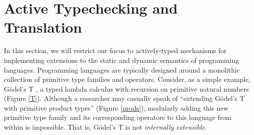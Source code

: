 


\section{Active Typechecking and Translation}\label{att}

In this section, we will restrict our focus to actively-typed mechanisms for implementing extensions to the static and dynamic semantics of programming languages. Programming languages are typically designed around a monolithic collection of primitive type families and operators. Consider, as a simple example, G\"odel's T \cite{pfpl}, a typed lambda calculus with recursion on primitive natural numbers (Figure \ref{T}). Although a researcher may casually speak of ``extending G\"odel's T with primitive product types'' (Figure \ref{prods}), modularly adding this new primitive type family and its corresponding operators to this language from within is impossible. That is, G\"odel's T is not \emph{internally extensible}.

